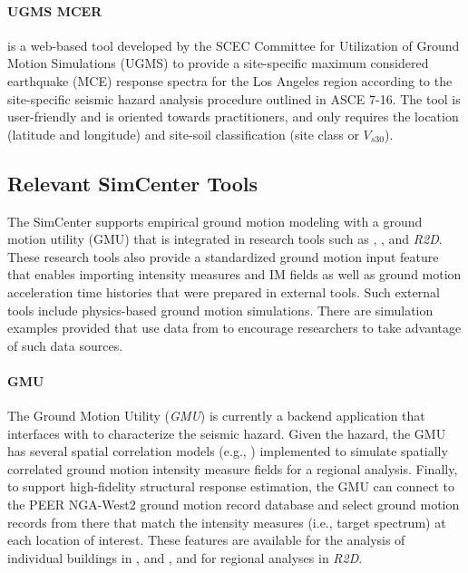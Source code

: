 \paragraph{UGMS MCER}  \citep{crouse2018sitespecific} is a web-based tool developed by the SCEC Committee for Utilization of Ground Motion Simulations (UGMS) to provide a site-specific maximum considered earthquake (MCE) response spectra for the Los Angeles region according to the site-specific seismic hazard analysis procedure outlined in ASCE 7-16. The tool is user-friendly and is oriented towards practitioners, and only requires the location (latitude and longitude) and site-soil classification (site class or $V_{s30}$).

\subsection{Relevant SimCenter Tools}

The SimCenter supports empirical ground motion modeling with a ground motion utility (GMU) that is integrated in research tools such as , , and \emph{R2D}. These research tools also provide a standardized ground motion input feature that enables importing intensity measures and IM fields as well as ground motion acceleration time histories that were prepared in external tools. Such external tools include physics-based ground motion simulations. There are simulation examples provided that use data from  to encourage researchers to take advantage of such data sources. 

\paragraph{GMU} The Ground Motion Utility (\emph{GMU}) is currently a backend application that interfaces with  to characterize the seismic hazard. Given the hazard, the GMU has several spatial correlation models (e.g., \cite{jayaram2008correlation, markhvida2018modeling}) implemented to simulate spatially correlated ground motion intensity measure fields for a regional analysis. Finally, to support high-fidelity structural response estimation, the GMU can connect to the PEER NGA-West2 ground motion record database \citep{ancheta2014ngawest2} and select ground motion records from there that match the intensity measures (i.e., target spectrum) at each location of interest. These features are available for the analysis of individual buildings in , and , and for regional analyses in \emph{R2D}.

